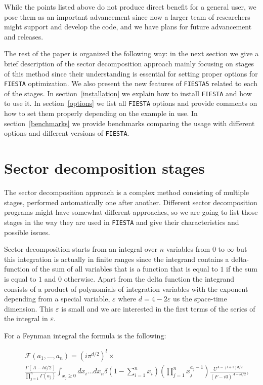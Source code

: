 \documentclass[preprint,12pt]{elsarticle}
\newcommand{\ep}{\varepsilon}
\begin{document}
While the points listed above do not produce direct benefit for a general user, we pose them as an important advancement since now a larger team of researchers might support and develop the code,
and we have plans for future advancement and releases.

The rest of the paper is organized the following way: in the next section we give a brief description 
of the sector decomposition approach mainly focusing on stages of this method since their understanding 
is essential for setting proper options for {\tt FIESTA} optimization. We also present the new features
of {\tt FIESTA5} related to each of the stages. In section~\ref{installation} we explain how to install {\tt FIESTA} and how to use it. In section~\ref{options} we list all {\tt FIESTA} options and provide comments on how to set them properly depending on the example in use. In section~\ref{benchmarks} we provide benchmarks comparing the usage with different options and different versions of {\tt FIESTA}.

\section{Sector decomposition stages}

The sector decomposition approach is a complex method consisting of multiple stages, performed automatically one after another. Different sector decomposition programs might have somewhat different approaches, so we are going to list those stages in the way they are used in {\tt FIESTA} and give their characteristics and possible issues.

Sector decomposition starts from an integral over $n$ variables from $0$ to $\infty$ but this integration is actually in finite ranges since the integrand contains a delta-function of the sum of all variables that is a function that is equal to $1$ if the sum is equal to $1$ and $0$ otherwise. Apart from the delta function the integrand consists of a product of polynomials of integration variables with the exponent depending from a special variable, $\ep$ where $d = 4 - 2 \ep$ us the space-time dimension. This $\ep$ is small and we are interested in the first terms of the series of the integral in $\ep$.

For a Feynman integral the formula is the following:

\begin{eqnarray}\label{Alpha}
    &&\mathcal F(a_1,\ldots,a_n) =(i\pi^{d/2})^l\times
   \\\nonumber
    &&\frac{\Gamma(A-l d/2)}{\prod_{j=1}^n \Gamma(a_j)}
            \int_{x_j\geq 0} d x_i\ldots d x_{n} \delta\left(1-\sum_{i=1}^n x_i \right)
                \left(\prod_{j=1}^n x_j^{a_j-1}\right) \frac{U^{A-(l+1)d/2}}{(F-i0)^{A-ld/2}},                         
\end{eqnarray}
\end{document}
